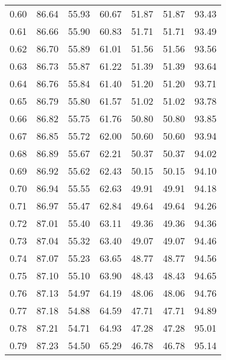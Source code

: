 \begin{tabular}{|c|c|c|c|c|c|c|}
      0.60 &     86.64 &     55.93 &      60.67 &   51.87 &      51.87 &         93.43 \\
      0.61 &     86.66 &     55.90 &      60.83 &   51.71 &      51.71 &         93.49 \\
      0.62 &     86.70 &     55.89 &      61.01 &   51.56 &      51.56 &         93.56 \\
      0.63 &     86.73 &     55.87 &      61.22 &   51.39 &      51.39 &         93.64 \\
      0.64 &     86.76 &     55.84 &      61.40 &   51.20 &      51.20 &         93.71 \\
      0.65 &     86.79 &     55.80 &      61.57 &   51.02 &      51.02 &         93.78 \\
      0.66 &     86.82 &     55.75 &      61.76 &   50.80 &      50.80 &         93.85 \\
      0.67 &     86.85 &     55.72 &      62.00 &   50.60 &      50.60 &         93.94 \\
      0.68 &     86.89 &     55.67 &      62.21 &   50.37 &      50.37 &         94.02 \\
      0.69 &     86.92 &     55.62 &      62.43 &   50.15 &      50.15 &         94.10 \\
      0.70 &     86.94 &     55.55 &      62.63 &   49.91 &      49.91 &         94.18 \\
      0.71 &     86.97 &     55.47 &      62.84 &   49.64 &      49.64 &         94.26 \\
      0.72 &     87.01 &     55.40 &      63.11 &   49.36 &      49.36 &         94.36 \\
      0.73 &     87.04 &     55.32 &      63.40 &   49.07 &      49.07 &         94.46 \\
      0.74 &     87.07 &     55.23 &      63.65 &   48.77 &      48.77 &         94.56 \\
      0.75 &     87.10 &     55.10 &      63.90 &   48.43 &      48.43 &         94.65 \\
      0.76 &     87.13 &     54.97 &      64.19 &   48.06 &      48.06 &         94.76 \\
      0.77 &     87.18 &     54.88 &      64.59 &   47.71 &      47.71 &         94.89 \\
      0.78 &     87.21 &     54.71 &      64.93 &   47.28 &      47.28 &         95.01 \\
      0.79 &     87.23 &     54.50 &      65.29 &   46.78 &      46.78 &         95.14 \\

\end{tabular}
